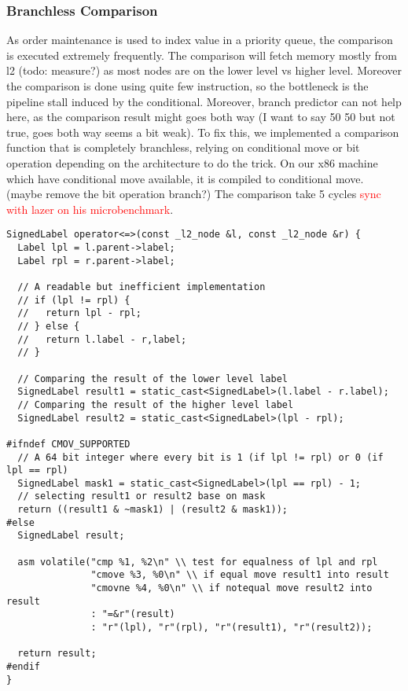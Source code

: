 \documentclass[format=acmsmall, review=false, screen=true]{acmart}
\newcommand\todo[1]{\textcolor{red}{#1}}
\begin{document}
\subsubsection{Branchless Comparison}
As order maintenance is used to index value in a priority queue, the comparison is executed extremely frequently. The comparison will fetch memory mostly from l2 (todo: measure?) as most nodes are on the lower level vs higher level. Moreover the comparison is done using quite few instruction, so the bottleneck is the pipeline stall induced by the conditional. Moreover, branch predictor can not help here, as the comparison result might goes both way (I want to say 50 50 but not true, goes both way seems a bit weak). To fix this, we implemented a comparison function that is completely branchless, relying on conditional move or bit operation depending on the architecture to do the trick. On our x86 machine which have conditional move available, it is compiled to conditional move. (maybe remove the bit operation branch?) The comparison take 5 cycles \todo{sync with lazer on his microbenchmark}.
\begin{verbatim}
SignedLabel operator<=>(const _l2_node &l, const _l2_node &r) {
  Label lpl = l.parent->label;
  Label rpl = r.parent->label;
  
  // A readable but inefficient implementation
  // if (lpl != rpl) {
  //   return lpl - rpl;
  // } else {
  //   return l.label - r,label;
  // }
  
  // Comparing the result of the lower level label
  SignedLabel result1 = static_cast<SignedLabel>(l.label - r.label); 
  // Comparing the result of the higher level label
  SignedLabel result2 = static_cast<SignedLabel>(lpl - rpl); 
  
#ifndef CMOV_SUPPORTED
  // A 64 bit integer where every bit is 1 (if lpl != rpl) or 0 (if lpl == rpl)
  SignedLabel mask1 = static_cast<SignedLabel>(lpl == rpl) - 1; 
  // selecting result1 or result2 base on mask  
  return ((result1 & ~mask1) | (result2 & mask1)); 
#else
  SignedLabel result;

  asm volatile("cmp %1, %2\n" \\ test for equalness of lpl and rpl
               "cmove %3, %0\n" \\ if equal move result1 into result
               "cmovne %4, %0\n" \\ if notequal move result2 into result
               : "=&r"(result)
               : "r"(lpl), "r"(rpl), "r"(result1), "r"(result2));

  return result;
#endif
}
\end{verbatim}
\end{document}
